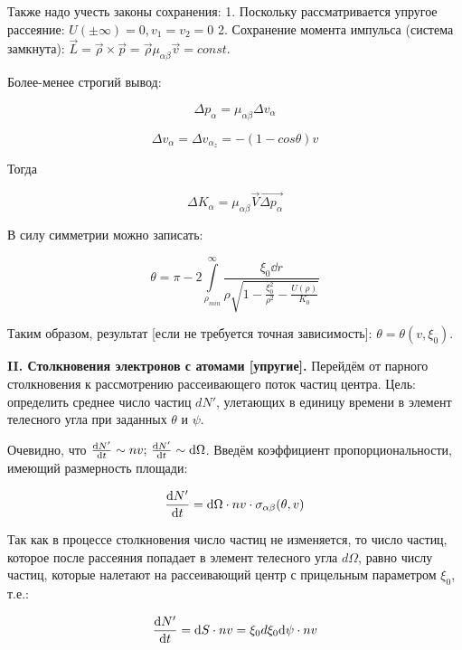 \documentclass[10pt, a4paper]{article}
\begin{document}
Также надо учесть законы сохранения: 1. Поскольку рассматривается упругое рассеяние: $U(\pm \infty) = 0, v_1 = v_2 = 0$ 2. Сохранение момента импульса (система замкнута): $\vec{L} = \vec{\rho} \times \vec{p} = \vec{\rho} \mu_{\alpha\beta} \vec{v} = const$.

Более-менее строгий вывод:

\begin{equation*}
	\Delta p_\alpha = \mu_{\alpha\beta} \Delta v_\alpha
\end{equation*}

\begin{equation*}
	\Delta v_\alpha = \Delta v_{\alpha_{z}} = -(1-cos\theta)v
\end{equation*}

Тогда

\begin{equation} \label{eq:center_mass_K}
	\Delta K_\alpha = \mu_{\alpha\beta}\vec{V}\overrightarrow{\Delta p_\alpha} 
\end{equation}

В силу симметрии можно записать:

\begin{equation*}
	\theta = \pi - 2 \int\limits_{\rho_{min}}^{\infty}\frac{\xi_0 \dd r}{\rho\sqrt{1-\frac{\xi_0^2}{\rho^2}-\frac{U(\rho)}{K_0}}}
\end{equation*}

Таким образом, результат [если не требуется точная зависимость]: $\theta = \theta(v, \xi_0)$.

{\bfseries \large II. Столкновения электронов с атомами [упругие].} Перейдём от парного столкновения к рассмотрению рассеивающего поток частиц центра. Цель: определить среднее число частиц $dN'$, улетающих в единицу времени в элемент телесного угла при заданных $\theta$ и $\psi$.

Очевидно, что $\dv{N'}{t} \sim nv;\, \dv{N'}{t} \sim \dd \Omega$. Введём коэффициент пропорциональности, имеющий размерность площади:

\begin{equation*}
	\dv{N'}{t} = \dd\Omega\cdot nv \cdot \sigma_{\alpha\beta}(\theta, v)
\end{equation*}

Так как в процессе столкновения число частиц не изменяется, то число частиц, которое после рассеяния попадает в элемент телесного угла $d\Omega$, равно числу частиц, которые налетают на рассеивающий центр с прицельным параметром $\xi_0$, т.е.:

\begin{equation*}
	\dv{N'}{t} = \dd S \cdot nv = \xi_0 d\xi_0 \dd\psi   \cdot nv
\end{equation*}
\end{document}

